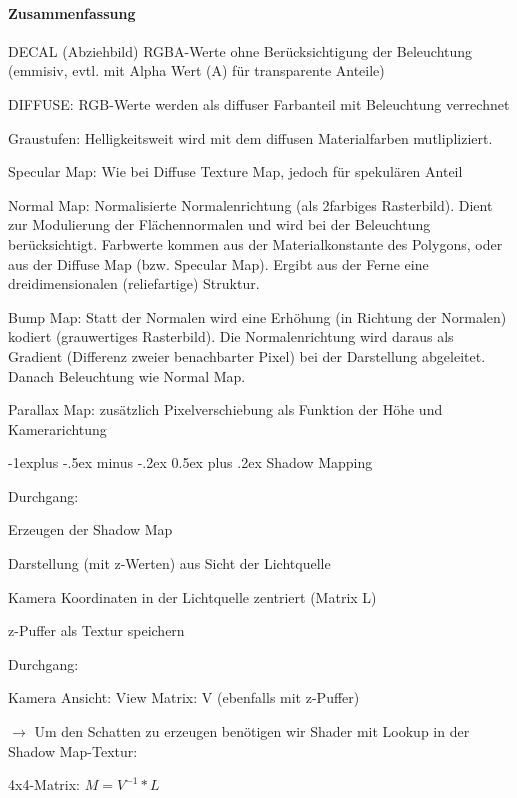 \documentclass[landscape]{article}
\makeatletter
\renewcommand{\subsection}{\@startsection{subsection}{2}{0mm}%
                                {-1explus -.5ex minus -.2ex}%
                                {0.5ex plus .2ex}%
                                {\normalfont\normalsize\bfseries}}
\makeatother
\begin{document}
\begin{multicols}{3}
  \paragraph{Zusammenfassung}
  \begin{itemize*}
    \item DECAL (Abziehbild) RGBA-Werte ohne Berücksichtigung der Beleuchtung (emmisiv, evtl. mit Alpha Wert (A) für transparente Anteile)
    \item DIFFUSE: RGB-Werte werden als diffuser Farbanteil mit Beleuchtung verrechnet
    \item Graustufen: Helligkeitsweit wird mit dem diffusen Materialfarben mutlipliziert.
    \item Specular Map: Wie bei Diffuse Texture Map, jedoch für spekulären Anteil
    \item Normal Map: Normalisierte Normalenrichtung (als 2farbiges Rasterbild). Dient zur Modulierung der Flächennormalen und wird bei der Beleuchtung berücksichtigt. Farbwerte kommen aus der Materialkonstante des Polygons, oder aus der Diffuse Map (bzw. Specular Map). Ergibt aus der Ferne eine dreidimensionalen (reliefartige) Struktur.
    \item Bump Map: Statt der Normalen wird eine Erhöhung (in Richtung der Normalen) kodiert (grauwertiges Rasterbild). Die Normalenrichtung wird daraus als Gradient (Differenz zweier benachbarter Pixel) bei der Darstellung abgeleitet. Danach Beleuchtung wie Normal Map.
    \item Parallax Map: zusätzlich Pixelverschiebung als Funktion der Höhe und Kamerarichtung
  \end{itemize*}
  
  \subsection{ Shadow Mapping}
  \begin{enumerate*}
    \item Durchgang:
    \begin{itemize*} 
      \item Erzeugen der Shadow Map
      \item Darstellung (mit z-Werten) aus Sicht der Lichtquelle
      \item Kamera Koordinaten in der Lichtquelle zentriert (Matrix L)
      \item z-Puffer als Textur speichern
    \end{itemize*}
    \item Durchgang:
    \begin{itemize*}
      \item Kamera Ansicht: View Matrix: V (ebenfalls mit z-Puffer)
      \item $\rightarrow$ Um den Schatten zu erzeugen benötigen wir Shader mit Lookup in der Shadow Map-Textur:
      \item 4x4-Matrix: $M = V^{-1}*L$
    \end{itemize*}
  \end{enumerate*}
  

\end{multicols}
\end{document}
